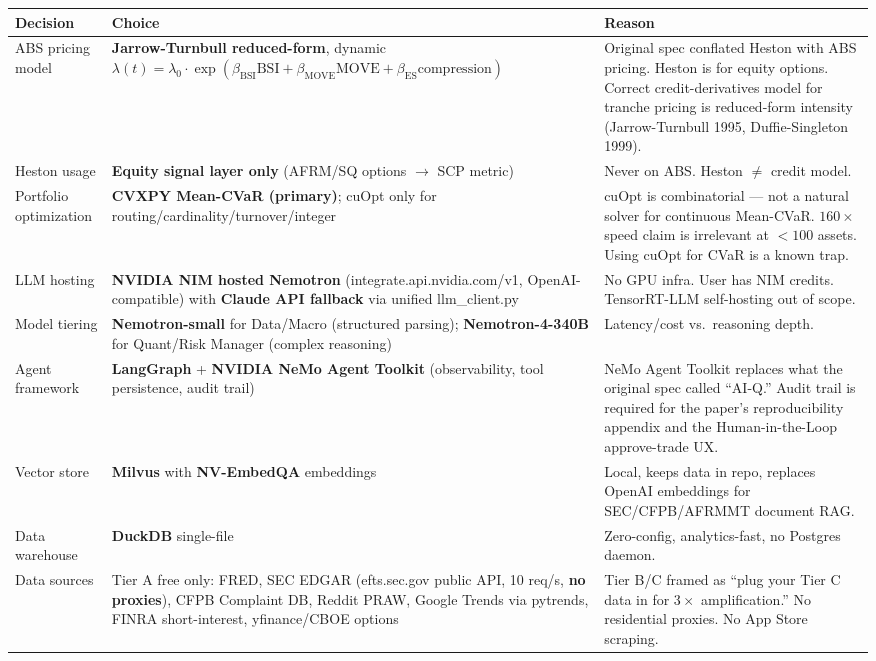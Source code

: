 \documentclass[11pt]{article}
\newcommand{\inlinecode}[1]{{\ttfamily\small #1}}
\begin{document}
{\small
\begin{longtable}{@{}p{3.2cm} p{4.8cm} p{7.5cm}@{}}
\toprule
\textbf{Decision} & \textbf{Choice} & \textbf{Reason} \\
\midrule
\endhead
ABS pricing model & \textbf{Jarrow-Turnbull reduced-form}, dynamic $\lambda(t) = \lambda_0 \cdot \exp(\beta_{\mathrm{BSI}} \mathrm{BSI} + \beta_{\mathrm{MOVE}} \mathrm{MOVE} + \beta_{\mathrm{ES}} \mathrm{compression})$ & Original spec conflated Heston with ABS pricing. Heston is for equity options. Correct credit-derivatives model for tranche pricing is reduced-form intensity (Jarrow-Turnbull 1995, Duffie-Singleton 1999). \\
Heston usage & \textbf{Equity signal layer only} (AFRM/SQ options $\to$ SCP metric) & Never on ABS. Heston $\ne$ credit model. \\
Portfolio optimization & \textbf{CVXPY Mean-CVaR (primary)}; cuOpt only for routing/cardinality/turnover/integer & cuOpt is combinatorial --- not a natural solver for continuous Mean-CVaR. $160\times$ speed claim is irrelevant at $<100$ assets. Using cuOpt for CVaR is a known trap. \\
LLM hosting & \textbf{NVIDIA NIM hosted Nemotron} (\inlinecode{integrate.api.nvidia.com/v1}, OpenAI-compatible) with \textbf{Claude API fallback} via unified \inlinecode{llm\_client.py} & No GPU infra. User has NIM credits. TensorRT-LLM self-hosting out of scope. \\
Model tiering & \textbf{Nemotron-small} for Data/Macro (structured parsing); \textbf{Nemotron-4-340B} for Quant/Risk Manager (complex reasoning) & Latency/cost vs.\ reasoning depth. \\
Agent framework & \textbf{LangGraph} + \textbf{NVIDIA NeMo Agent Toolkit} (observability, tool persistence, audit trail) & NeMo Agent Toolkit replaces what the original spec called ``AI-Q.'' Audit trail is required for the paper's reproducibility appendix and the Human-in-the-Loop approve-trade UX. \\
Vector store & \textbf{Milvus} with \textbf{NV-EmbedQA} embeddings & Local, keeps data in repo, replaces OpenAI embeddings for SEC/CFPB/AFRMMT document RAG. \\
Data warehouse & \textbf{DuckDB} single-file & Zero-config, analytics-fast, no Postgres daemon. \\
Data sources & Tier A free only: FRED, SEC EDGAR (\inlinecode{efts.sec.gov} public API, 10 req/s, \textbf{no proxies}), CFPB Complaint DB, Reddit PRAW, Google Trends via \inlinecode{pytrends}, FINRA short-interest, yfinance/CBOE options & Tier B/C framed as ``plug your Tier C data in for $3\times$ amplification.'' No residential proxies. No App Store scraping. \\

\end{longtable}}
\end{document}
